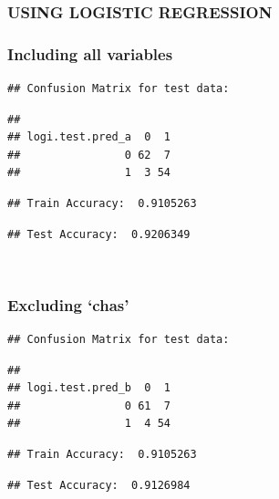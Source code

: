 \documentclass[]{article}
\begin{document}
\newpage

\subsubsection{USING LOGISTIC
REGRESSION}\label{using-logistic-regression}

\subsubsection{Including all variables}\label{including-all-variables}

\begin{verbatim}
## Confusion Matrix for test data:
\end{verbatim}

\begin{verbatim}
##                 
## logi.test.pred_a  0  1
##                0 62  7
##                1  3 54
\end{verbatim}

\begin{verbatim}
## Train Accuracy:  0.9105263
\end{verbatim}

\begin{verbatim}
## Test Accuracy:  0.9206349
\end{verbatim}

~

\subsubsection{\texorpdfstring{Excluding
`chas'}{Excluding chas}}\label{excluding-chas}

\begin{verbatim}
## Confusion Matrix for test data:
\end{verbatim}

\begin{verbatim}
##                 
## logi.test.pred_b  0  1
##                0 61  7
##                1  4 54
\end{verbatim}

\begin{verbatim}
## Train Accuracy:  0.9105263
\end{verbatim}

\begin{verbatim}
## Test Accuracy:  0.9126984
\end{verbatim}

~

~
\end{document}
